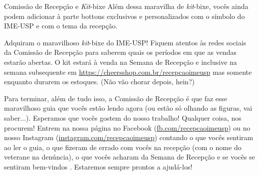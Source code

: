 \begin{secao}{Comissão de Recepção e \textit{Kit}-bixe}
Além dessa maravilha de \textit{kit}-bixe, vocês ainda podem adicionar à parte bottons
exclusivos e personalizados com o símbolo do IME-USP e com o tema da recepção.

Adquiram o maravilhoso \textit{kit}-bixe do IME-USP! Fiquem atentos às redes sociais da
Comissão de Recepção para saberem quais os períodos em que as vendas estarão abertas.
O kit estará à venda na Semana de Recepção e inclusive na semana subsequente em
\url{https://cheersshop.com.br/recepcaoimeusp} mas somente enquanto
durarem os estoques. (Não vão chorar depois, hein?)

Para terminar, além de tudo isso, a Comissão de Recepção é que faz esse maravilhoso guia que
vocês estão lendo agora (ou estão só olhando as figuras, vai
saber...). Esperamos que vocês gostem do nosso trabalho! Qualquer coisa, nos
procurem! Entrem na nossa página no Facebook (\url{fb.com/recepcaoimeusp}) ou no nosso
Instagram (\url{instagram.com/recepcaoimeusp}) contando
o que vocês sentiram ao ler o guia, o que fizeram de errado com vocês na
recepção (com o nome do veterane na denúncia), o que vocês acharam da Semana
de Recepção e se vocês se sentiram bem-vindos . Estaremos sempre prontos a ajudá-los!
\end{secao}
